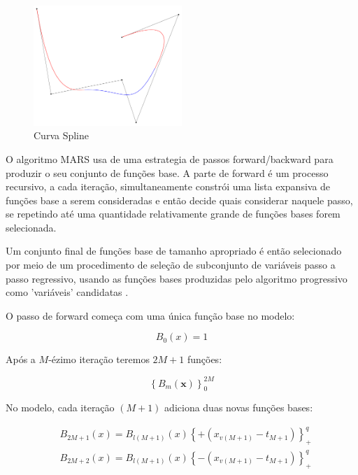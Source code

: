 \documentclass[
    12pt,               %
    openright,          %
    oneside,            %
    a4paper,            %
    english,            %
    brazil              %
    ]{abntex2}
\begin{document}
\begin{figure}[H]
    \centering
    \caption{\label{Curva Spline}Curva Spline}
    \includegraphics[width=0.50\textwidth]{../imgs/B-spline_curve.png}
\end{figure}

O algoritmo MARS usa de uma estrategia de passos forward/backward para produzir o seu conjunto de funções base. A parte de forward é um
processo recursivo, a cada iteração, simultaneamente constrói uma lista expansiva de funções base a serem consideradas e então decide 
quais considerar naquele passo, se repetindo até uma quantidade relativamente grande de funções bases forem selecionada. 

Um conjunto final de funções base de tamanho apropriado é então selecionado por meio de um procedimento de seleção de subconjunto de 
variáveis passo a passo regressivo, usando as funções bases produzidas pelo algoritmo progressivo como 'variáveis' 
candidatas \cite{intro_mars}.

O passo de forward começa com uma única função base no modelo:

\begin{equation}
    \label{inicio_funcao_base}
    B_0(x) = 1
\end{equation}

Após a $M$-ézimo iteração teremos $2M+1$ funções:

\begin{equation}
    \label{funcao_base}
    \left\{B_m(\mathbf{x})\right\}_{0}^{2M}
\end{equation}

No modelo, cada iteração $(M + 1)$ adiciona duas novas funções bases:

\begin{equation}
    \label{novas_funcoes}
    \begin{split}
        & B_{2M+1}(x) = B_{l(M+1)}(x)\left\{+(x_{v(M+1)}-t_{M+1})\right\}_{+}^{q} \\
        & B_{2M+2}(x) = B_{l(M+1)}(x)\left\{-(x_{v(M+1)}-t_{M+1})\right\}_{+}^{q} \\
    \end{split}
\end{equation}
\end{document}
